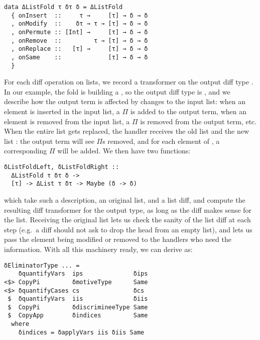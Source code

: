 \begin{minipage}{\textwidth}
\begin{verbatim}
data ΔListFold τ δτ δ = ΔListFold
  { onInsert  ::     τ →     [τ] → δ → δ
  , onModify  ::    δτ → τ → [τ] → δ → δ
  , onPermute :: [Int] →     [τ] → δ → δ
  , onRemove  ::         τ → [τ] → δ → δ
  , onReplace ::   [τ] →     [τ] → δ → δ
  , onSame    ::             [τ] → δ → δ
  }
\end{verbatim}
\end{minipage}

\noindent For each diff operation on lists, we record a transformer on the
output diff type .  In our example, the fold is building a
, so the output diff type is , and we describe
how the output term is affected by changes to the input list: when an element is
inserted in the input list, a $\Pi$ is added to the output term, when an element
is removed from the input list, a $\Pi$ is removed from the output term, etc.
When the entire list gets replaced, the handler receives the old list
 and the new list : the output term will see
 $\Pi$s removed, and for each element of , a
corresponding $\Pi$ will be added.  We then have two functions:

\noindent
\begin{minipage}{\textwidth}
\begin{verbatim}
δListFoldLeft, δListFoldRight ::
  ΔListFold τ δτ δ ->
  [τ] -> ΔList τ δτ -> Maybe (δ -> δ)
\end{verbatim}
\end{minipage}

\noindent which take such a description, an original list, and a list diff, and
compute the resulting diff transformer for the output type, as long as the diff
makes sense for the list.  Receiving the original list lets us check the sanity
of the list diff at each step (e.g.\ a diff should not ask to drop the head from
an empty list), and lets us pass the element being modified or removed to the
handlers who need the information.  With all this machinery ready, we can derive
 as:

\noindent
\begin{minipage}{\textwidth}
\begin{verbatim}
δEliminatorType ... =
    δquantifyVars  ips              δips
<$> CopyPi         δmotiveType      Same
<$> δquantifyCases cs               δcs
 $  δquantifyVars  iis              δiis
 $  CopyPi         δdiscrimineeType Same
 $  CopyApp        δindices         Same
  where
    δindices = δapplyVars iis δiis Same
\end{verbatim}
\end{minipage}

